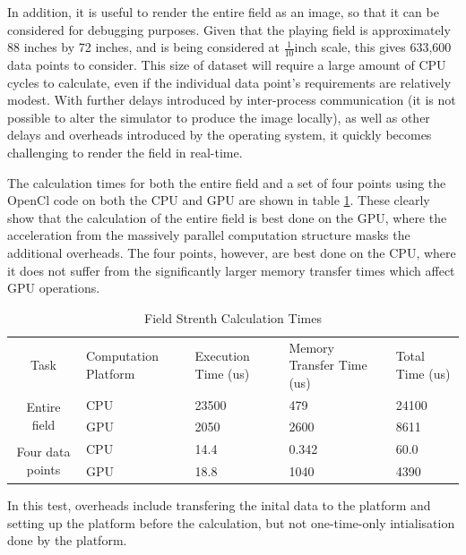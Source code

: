 \documentclass[10pt]{article}
\begin{document}
In addition, it is useful to render the entire field as an image, so that it can be considered for debugging purposes. Given that the playing field is approximately 88 inches by 72 inches, and is being considered at $\frac{1}{10}$inch scale, this gives 633,600 data points to consider. This size of dataset will require a large amount of \ac{CPU} cycles to calculate, even if the individual data point's requirements are relatively modest. With further delays introduced by inter-process communication (it is not possible to alter the simulator to produce the image locally), as well as other delays and overheads introduced by the operating system, it quickly becomes challenging to render the field in real-time.

The calculation times for both the entire field and a set of four points using the OpenCl code on both the \ac{CPU} and \ac{GPU} are shown in table \ref{tab:Field-Strenth-Calculation}. These clearly show that the calculation of the entire field is best done on the GPU, where the acceleration from the massively parallel computation structure masks the additional overheads. The four points, however, are best done on the \ac{CPU}, where it does not suffer from the significantly larger memory transfer times which affect \ac{GPU} operations.

\begin{singlespace}
\begin{table}
\centering%
\begin{tabular}{|c|m{2cm}|p{2cm}|p{3cm}|m{2cm}|}
\hline
\multirow{2}{*}{Task} & \multirow{2}{3cm}{Computation Platform} & \multirow{2}{2cm}{Execution Time (us)} & \multirow{2}{3cm}{Memory Transfer Time (us)} & \multirow{2}{2cm}{Total Time (us)} \\
 &  &  &  & \\
\hline
\multirow{2}{*}{Entire field} & CPU & 23500 & 479 & 24100 \\
\cline{2-5}
 & GPU & 2050 & 2600 & 8611 \\
\hline
\multirow{2}{*}{Four data points} & CPU & 14.4 & 0.342 & 60.0 \\
\cline{2-5}
 & GPU & 18.8 & 1040 & 4390 \\
\hline
\end{tabular}

In this test, overheads include transfering the inital data to the platform and setting up the platform before the calculation, but not one-time-only intialisation done by the platform.

\caption{Field Strenth Calculation Times\label{tab:Field-Strenth-Calculation}}
\end{table}

\end{singlespace}
\end{document}
